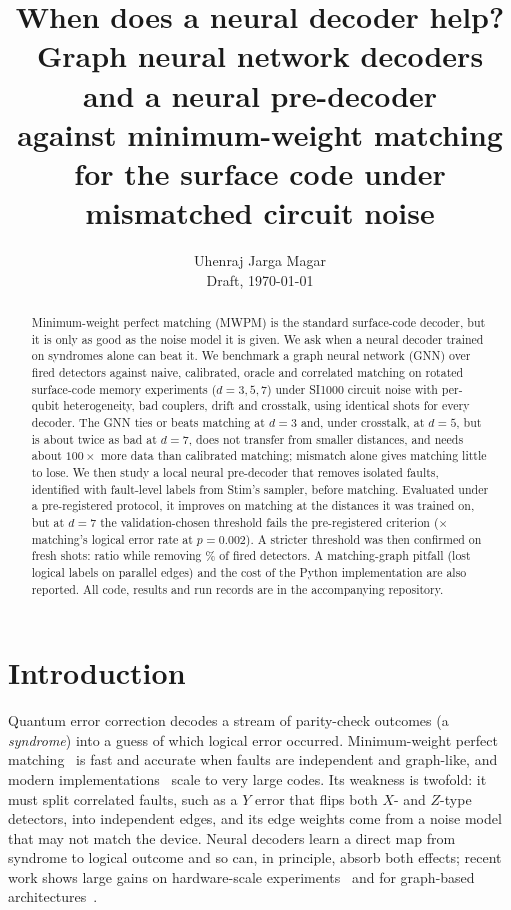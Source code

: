 \documentclass[11pt]{article}
\title{When does a neural decoder help? Graph neural network decoders and a neural pre-decoder\\
against minimum-weight matching for the surface code under mismatched circuit noise}
\author{Uhenraj Jarga Magar\\ \small Draft, \today}
\date{}
\begin{document}
\maketitle

\begin{abstract}
Minimum-weight perfect matching (MWPM) is the standard surface-code decoder, but it is only as good as the noise model it is given. We ask when a neural decoder trained on syndromes alone can beat it. We benchmark a graph neural network (GNN) over fired detectors against naive, calibrated, oracle and correlated matching on rotated surface-code memory experiments ($d=3,5,7$) under SI1000 circuit noise with per-qubit heterogeneity, bad couplers, drift and crosstalk, using identical shots for every decoder. The GNN ties or beats matching at $d=3$ and, under crosstalk, at $d=5$, but is about twice as bad at $d=7$, does not transfer from smaller distances, and needs about $100\times$ more data than calibrated matching; mismatch alone gives matching little to lose. We then study a local neural pre-decoder that removes isolated faults, identified with fault-level labels from Stim's sampler, before matching. Evaluated under a pre-registered protocol, it improves on matching at the distances it was trained on, but at $d=7$ the validation-chosen threshold fails the pre-registered criterion (\nineRatio$\times$ matching's logical error rate at $p=0.002$). A stricter threshold was then confirmed on fresh shots: ratio \armBRatio{} while removing \armBRemoved\% of fired detectors. A matching-graph pitfall (lost logical labels on parallel edges) and the cost of the Python implementation are also reported. All code, results and run records are in the accompanying repository.
\end{abstract}

\section{Introduction}
Quantum error correction decodes a stream of parity-check outcomes (a \emph{syndrome}) into a guess of which logical error occurred. Minimum-weight perfect matching~\cite{dennis2002,fowler2015} is fast and accurate when faults are independent and graph-like, and modern implementations~\cite{higgott2022,higgott2023sparse} scale to very large codes. Its weakness is twofold: it must split correlated faults, such as a $Y$ error that flips both $X$- and $Z$-type detectors, into independent edges, and its edge weights come from a noise model that may not match the device. Neural decoders learn a direct map from syndrome to logical outcome and so can, in principle, absorb both effects; recent work shows large gains on hardware-scale experiments~\cite{bausch2024} and for graph-based architectures~\cite{lange2025}.
\end{document}
